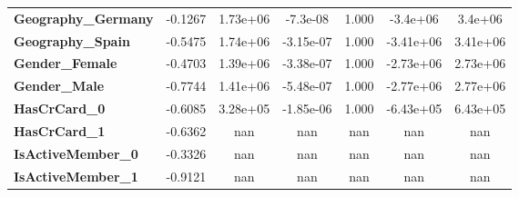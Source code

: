\begin{center}
\begin{tabular}{lcccccc}
\textbf{Geography\_Germany} &      -0.1267  &     1.73e+06     &  -7.3e-08  &         1.000        &     -3.4e+06    &      3.4e+06     \\
\textbf{Geography\_Spain}   &      -0.5475  &     1.74e+06     & -3.15e-07  &         1.000        &    -3.41e+06    &     3.41e+06     \\
\textbf{Gender\_Female}     &      -0.4703  &     1.39e+06     & -3.38e-07  &         1.000        &    -2.73e+06    &     2.73e+06     \\
\textbf{Gender\_Male}       &      -0.7744  &     1.41e+06     & -5.48e-07  &         1.000        &    -2.77e+06    &     2.77e+06     \\
\textbf{HasCrCard\_0}       &      -0.6085  &     3.28e+05     & -1.85e-06  &         1.000        &    -6.43e+05    &     6.43e+05     \\
\textbf{HasCrCard\_1}       &      -0.6362  &          nan     &       nan  &           nan        &          nan    &          nan     \\
\textbf{IsActiveMember\_0}  &      -0.3326  &          nan     &       nan  &           nan        &          nan    &          nan     \\
\textbf{IsActiveMember\_1}  &      -0.9121  &          nan     &       nan  &           nan        &          nan    &          nan     \\
\bottomrule
\end{tabular}
\end{center}